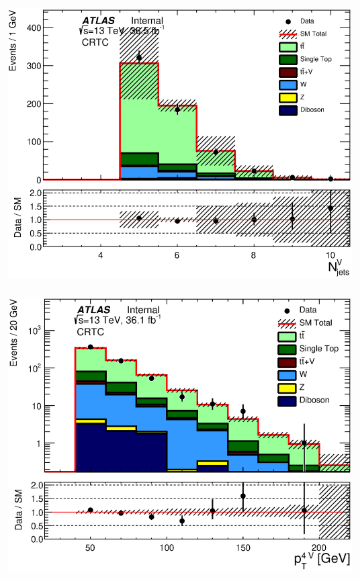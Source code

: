 \begin{figure}[h!]
\begin{subfigure}[b]{0.40\textwidth}
               \caption{ }
    \end{subfigure}
            \begin{subfigure}[b]{0.40\textwidth}  
    \includegraphics[width=\textwidth]{figures/ttbar/postfit/CA_NjV_CRTopC}
               \caption{ }
    \end{subfigure}
            \begin{subfigure}[b]{0.40\textwidth}  
    \includegraphics[width=\textwidth]{figures/ttbar/postfit/CA_pTjV4_CRTopC_log}
               \caption{ }
    \end{subfigure}
            \begin{subfigure}[b]{0.40\textwidth}  

\end{subfigure}
\end{figure}
